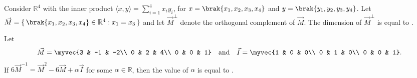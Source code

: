 \item Consider $\mathbb{R}^{4}$ with the inner product $\langle x,y\rangle=\sum_{i=1}^{4}x_{i}y_{i}$, for $x=\brak{x_{1},x_{2},x_{3},x_{4}}$ and $y=\brak{y_{1},y_{2},y_{3},y_{4}}$.  
Let $\vec{M}=\{\, \brak{x_{1},x_{2},x_{3},x_{4}}\in \mathbb{R}^{4} : x_{1}=x_{3}\,\}$ and let $\vec{M}^{\perp}$ denote the orthogonal complement of $\vec{M}$. The dimension of $\vec{M}^{\perp}$ is equal to \underline{\hspace{2cm}}.

\hfill{}
\item Let
\[
\vec{M}=\myvec{3 & -1 & -2\\ 0 & 2 & 4\\ 0 & 0 & 1}
\quad \text{and} \quad
\vec{I}=\myvec{1 & 0 & 0\\ 0 & 1 & 0\\ 0 & 0 & 1}.
\]
If $6\vec{M}^{-1}=\vec{M}^{2}-6\vec{M}+\alpha \vec{I}$ for some $\alpha \in \mathbb{R}$, then the value of $\alpha$ is equal to \underline{\hspace{2cm}}.

